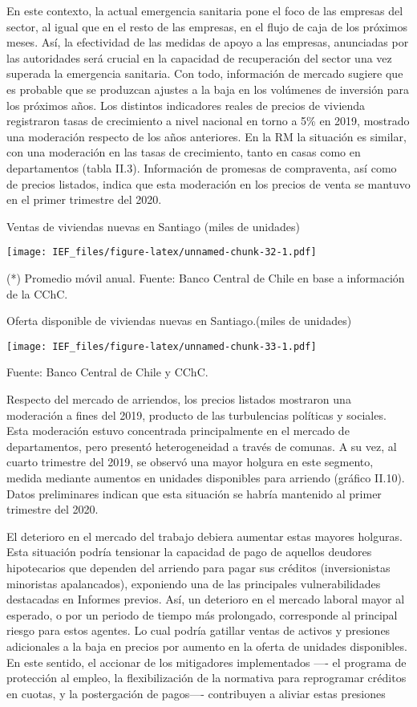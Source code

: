 \documentclass[
]{book}
\begin{document}
En este contexto, la actual emergencia sanitaria pone el foco de las empresas
del sector, al igual que en el resto de las empresas, en el flujo de caja de los
próximos meses. Así, la efectividad de las medidas de apoyo a las empresas,
anunciadas por las autoridades será crucial en la capacidad de recuperación
del sector una vez superada la emergencia sanitaria. Con todo, información
de mercado sugiere que es probable que se produzcan ajustes a la baja en los
volúmenes de inversión para los próximos años.
Los distintos indicadores reales de precios de vivienda registraron tasas de
crecimiento a nivel nacional en torno a 5\% en 2019, mostrado una moderación
respecto de los años anteriores. En la RM la situación es similar, con una
moderación en las tasas de crecimiento, tanto en casas como en departamentos
(tabla II.3). Información de promesas de compraventa, así como de precios
listados, indica que esta moderación en los precios de venta se mantuvo en el
primer trimestre del 2020.

Ventas de viviendas nuevas en Santiago (miles de unidades)

\texttt{[image: IEF\_files/figure-latex/unnamed-chunk-32-1.pdf]}

(*) Promedio móvil anual.
Fuente: Banco Central de Chile en base a información de la CChC.

Oferta disponible de viviendas nuevas en Santiago.(miles de unidades)

\texttt{[image: IEF\_files/figure-latex/unnamed-chunk-33-1.pdf]}

Fuente: Banco Central de Chile y CChC.

Respecto del mercado de arriendos, los precios listados mostraron una
moderación a fines del 2019, producto de las turbulencias políticas y sociales.
Esta moderación estuvo concentrada principalmente en el mercado de
departamentos, pero presentó heterogeneidad a través de comunas. A su vez,
al cuarto trimestre del 2019, se observó una mayor holgura en este segmento,
medida mediante aumentos en unidades disponibles para arriendo (gráfico
II.10). Datos preliminares indican que esta situación se habría mantenido al
primer trimestre del 2020.

El deterioro en el mercado del trabajo debiera aumentar estas mayores holguras.
Esta situación podría tensionar la capacidad de pago de aquellos deudores
hipotecarios que dependen del arriendo para pagar sus créditos (inversionistas
minoristas apalancados), exponiendo una de las principales vulnerabilidades
destacadas en Informes previos. Así, un deterioro en el mercado laboral mayor
al esperado, o por un periodo de tiempo más prolongado, corresponde al
principal riesgo para estos agentes. Lo cual podría gatillar ventas de activos y
presiones adicionales a la baja en precios por aumento en la oferta de unidades
disponibles. En este sentido, el accionar de los mitigadores implementados ----
el programa de protección al empleo, la flexibilización de la normativa para
reprogramar créditos en cuotas, y la postergación de pagos---- contribuyen a
aliviar estas presiones
\end{document}
